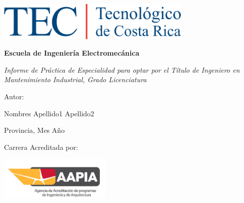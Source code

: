 \begin{titlepage}

\centering

{\includegraphics[width=0.7\textwidth]{01_preliminares/figuras/logo.png}\par}
\vspace{0.5cm}

{\bfseries\LARGE Escuela de Ingeniería Electromecánica\par}
\vspace{0.5cm}



\vfill

{\scshape\LARGE \lipsum[4][1-3] \par}
\vspace{1cm}

{\itshape\Large Informe de Práctica de Especialidad para optar por el Título de
Ingeniero en Mantenimiento Industrial, Grado Licenciatura \par}
\vspace{1cm}

{\Large Autor: \par}
{\Large Nombres Apellido1 Apellido2  \par}
\vspace{0.6cm}

{\Large Provincia, Mes Año \par}

\vspace{0.5cm}

{\Large Carrera Acreditada por: \par}
{\includegraphics[width=0.4\textwidth]{01_preliminares/figuras/AAPIA.png}\par}



\end{titlepage}
